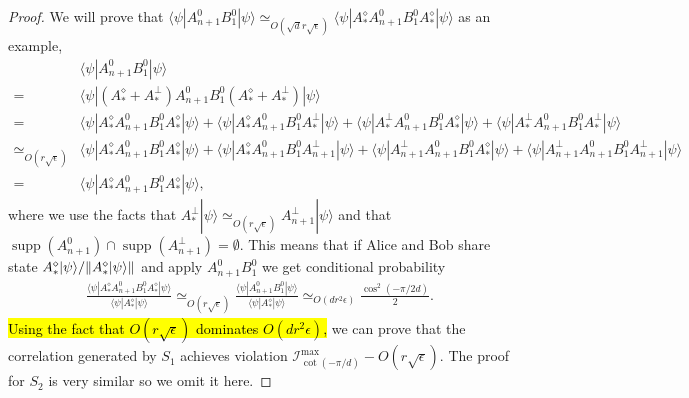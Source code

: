 \documentclass[11pt,letterpaper]{article}
\newcommand{\ket}[1]{|#1\rangle}
\newcommand{\bra}[1]{\langle#1|}
\DeclarePairedDelimiter{\norm}{\lVert}{\rVert}
\DeclareMathOperator{\supp}{supp}
\newcommand{\1}{\mathbb{1}}
\newcommand{\I}{\mathcal{I}}
\newcommand{\ep}{\epsilon}
\newcommand{\se}{\sqrt{\epsilon}}
\newcommand{\sd}{\sqrt{d}}
\newcommand{\appd}[1]{\simeq_{#1}}
\theoremstyle{definition}
\begin{document}
\begin{proof}
We will prove that $\bra{\psi} A_{n+1}^0B_1^0 \ket{\psi} \appd{O(\sd r\se)} \bra{\psi}A_\ast^\diamond A_{n+1}^0B_1^0 A_\ast^\diamond\ket{\psi}$ as an example,
\begin{align*}
	   &\bra{\psi} A_{n+1}^0B_1^0 \ket{\psi} \\
	= &\bra{\psi}(A_\ast^\diamond + A_\ast^\perp) A_{n+1}^0B_1^0 (A_\ast^\diamond + A_\ast^\perp)\ket{\psi} \\
	= & \bra{\psi}A_\ast^\diamond A_{n+1}^0B_1^0 A_\ast^\diamond\ket{\psi} + \bra{\psi}A_\ast^\diamond A_{n+1}^0B_1^0 A_\ast^\perp\ket{\psi}
	+\bra{\psi}A_\ast^\perp A_{n+1}^0B_1^0 A_\ast^\diamond\ket{\psi} + \bra{\psi}A_\ast^\perp A_{n+1}^0B_1^0 A_\ast^\perp\ket{\psi}\\
	\appd{O(r\se)} & \bra{\psi}A_\ast^\diamond A_{n+1}^0B_1^0 A_\ast^\diamond\ket{\psi} + \bra{\psi}A_\ast^\diamond A_{n+1}^0B_1^0 A_{n+1}^\perp\ket{\psi} 
	+\bra{\psi}A_{n+1}^\perp A_{n+1}^0B_1^0 A_\ast^\diamond\ket{\psi} + \bra{\psi}A_{n+1}^\perp A_{n+1}^0B_1^0 A_{n+1}^\perp\ket{\psi}\\
	=&\bra{\psi}A_\ast^\diamond A_{n+1}^0B_1^0 A_\ast^\diamond\ket{\psi},
\end{align*}
where we use the facts that $A_\ast^\perp \ket{\psi} \appd{O(r\se)} A_{n+1}^\perp \ket{\psi}$ and that 
$\supp(A_{n+1}^0) \cap \supp(A_{n+1}^\perp) = \emptyset$. This means that if Alice and Bob share state $A_\ast^\diamond \ket{\psi}/\norm{A_\ast^\diamond \ket{\psi}}$ and apply $A_{n+1}^0B_1^0$
we get conditional probability
\begin{align}
	\frac{\bra{\psi}A_\ast^\diamond A_{n+1}^0B_1^0 A_\ast^\diamond\ket{\psi}}{\bra{\psi} A_\ast^\diamond \ket{\psi}}  
	\appd{O(r\se)} \frac{\bra{\psi} A_{n+1}^0B_1^0 \ket{\psi}}{\bra{\psi} A_\ast^\diamond \ket{\psi}}
	\appd{O(d r^2 \ep)}
	\frac{\cos^2(-\pi/2d)}{2}.
\end{align} 
\hl{Using the fact that $O(r \se)$ dominates $O(dr^2 \ep)$,}
we can prove that the correlation generated by $S_1$ achieves violation $\I^{\max}_{\cot(-\pi/d)} - O(r \se)$.
The proof for $S_2$ is very similar so we omit it here.
\end{proof}
\end{document}
